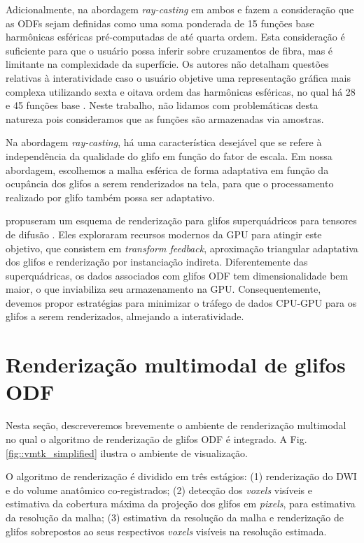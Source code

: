 Adicionalmente, na abordagem \textit{ray-casting} em ambos  e  fazem a consideração que as ODFs sejam definidas como uma soma ponderada de 15 funções base harmônicas esféricas pré-computadas de até quarta ordem. Esta consideração é suficiente para que o usuário possa inferir sobre cruzamentos de fibra, mas é limitante na complexidade da superfície. Os autores não detalham questões relativas à interatividade caso o usuário objetive uma representação gráfica mais complexa utilizando sexta e oitava ordem das harmônicas esféricas, no qual há 28 e 45 funções base \cite{descoteaux2007_QBI}. Neste trabalho, não lidamos com problemáticas desta natureza pois consideramos que as funções são armazenadas via amostras.

Na abordagem \textit{ray-casting}, há uma característica desejável que se refere à independência da qualidade do glifo em função do fator de escala. Em nossa abordagem, escolhemos a malha esférica de forma adaptativa em função da ocupância dos glifos a serem renderizados na tela, para que o processamento realizado por glifo também possa ser adaptativo.

 propuseram um esquema de renderização para glifos superquádricos para tensores de difusão \cite{Kindlmann2004}. Eles exploraram recursos modernos da GPU para atingir este objetivo, que consistem em \textit{transform feedback}, aproximação triangular adaptativa dos glifos e renderização por instanciação indireta. Diferentemente das superquádricas, os dados associados com glifos ODF tem dimensionalidade bem maior, o que inviabiliza seu armazenamento na GPU. Consequentemente, devemos propor estratégias para minimizar o tráfego de dados CPU-GPU para os glifos a serem renderizados, almejando a interatividade.

\section{Renderização multimodal de glifos ODF}
\label{sec::superquadricas}
Nesta seção, descreveremos brevemente o ambiente de renderização multimodal no qual o algoritmo de renderização de glifos ODF é integrado. A Fig. \ref{fig::vmtk_simplified} ilustra o ambiente de visualização.

O algoritmo de renderização é dividido em três estágios: (1) renderização do DWI e do volume anatômico co-registrados; (2) detecção dos \textit{voxels} visíveis e estimativa da cobertura máxima da projeção dos glifos em \textit{pixels}, para estimativa da resolução da malha; (3) estimativa da resolução da malha e renderização de glifos sobrepostos ao seus respectivos \textit{voxels} visíveis na resolução estimada.

